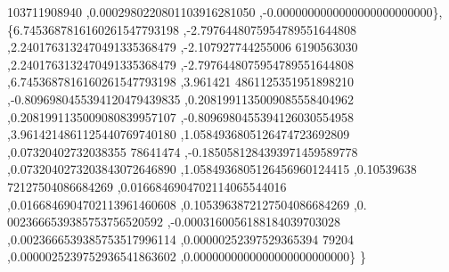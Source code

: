 \begin{DoxyCode}
      103711908940 ,0.0002980220801103916281050 ,-0.0000000000000000000000000\},
\{6.7453687816160261547793198 ,-2.7976448075954789551644808 ,2.2401763132470491335368479 ,-2.107927744255006
      6190563030 ,2.2401763132470491335368479 ,-2.7976448075954789551644808 ,6.7453687816160261547793198 ,3.961421
      4861125351951898210 ,-0.8096980455394120479439835 ,0.2081991135009085558404962 ,0.2081991135009080839957107 
      ,-0.8096980455394126030554958 ,3.9614214861125440769740180 ,1.0584936805126474723692809 ,0.07320402732038355
      78641474 ,-0.1850581284393971459589778 ,0.0732040273203843072646890 ,1.0584936805126456960124415 ,0.10539638
      72127504086684269 ,0.0166846904702114065544016 ,0.0166846904702113961460608 ,0.1053963872127504086684269 ,0.
      0023666539385753756520592 ,-0.0003160056188184039703028 ,0.0023666539385753517996114 ,0.00000252397529365394
      79204 ,0.0000025239752936541863602 ,0.0000000000000000000000000\}
\}
\end{DoxyCode}
\mbox{\label{a00461_aa74a89c56e8b622ff22b10ed31d772b1}} 
